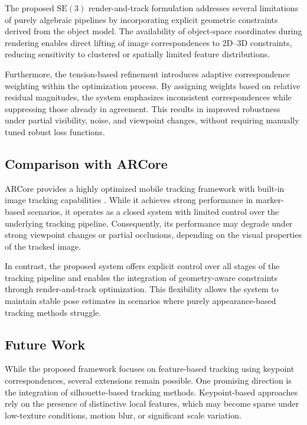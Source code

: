 The proposed $\mathrm{SE}(3)$ render-and-track formulation addresses several limitations of purely algebraic pipelines by incorporating explicit geometric constraints derived from the object model. The availability of object-space coordinates during rendering enables direct lifting of image correspondences to 2D--3D constraints, reducing sensitivity to clustered or spatially limited feature distributions.

Furthermore, the tension-based refinement introduces adaptive correspondence weighting within the optimization process. By assigning weights based on relative residual magnitudes, the system emphasizes inconsistent correspondences while suppressing those already in agreement. This results in improved robustness under partial visibility, noise, and viewpoint changes, without requiring manually tuned robust loss functions.

\subsection{Comparison with ARCore}

ARCore provides a highly optimized mobile tracking framework with built-in image tracking capabilities \cite{arcore}. While it achieves strong performance in marker-based scenarios, it operates as a closed system with limited control over the underlying tracking pipeline. Consequently, its performance may degrade under strong viewpoint changes or partial occlusions, depending on the visual properties of the tracked image.

In contrast, the proposed system offers explicit control over all stages of the tracking pipeline and enables the integration of geometry-aware constraints through render-and-track optimization. This flexibility allows the system to maintain stable pose estimates in scenarios where purely appearance-based tracking methods struggle.

\subsection{Future Work}

While the proposed framework focuses on feature-based tracking using keypoint correspondences, several extensions remain possible. One promising direction is the integration of silhouette-based tracking methods. Keypoint-based approaches rely on the presence of distinctive local features, which may become sparse under low-texture conditions, motion blur, or significant scale variation.

